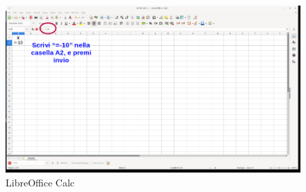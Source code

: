 \begin{figure}[h!]		
	\centering
   	\includegraphics[width=8.0in]{pictures/picture_001.png}
   	\caption{LibreOffice Calc}
   	\label{fig:LibreOfficeCalc001}
\end{figure}